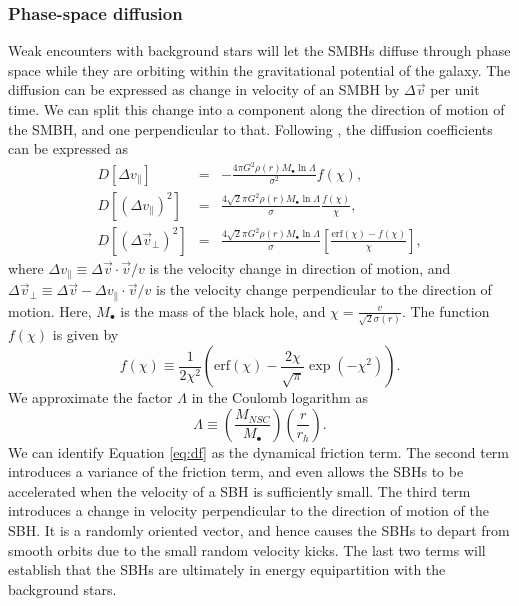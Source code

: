 \documentclass[english, backref,breaklinks,colorlinks,citecolor=blue, usenatbib]{mnras}
\begin{document}
\subsubsection{Phase-space diffusion} \label{psd}
Weak encounters with background stars will let the SMBHs diffuse through phase space while they are orbiting within the gravitational potential of the galaxy. The diffusion can be expressed as change in velocity of an SMBH by $\Delta \vec{v}$ per unit time. We can split this change into a component along the direction of motion of the SMBH, and one perpendicular to that. Following \citet{2008gady.book.....B}, the diffusion coefficients can be expressed as 
\begin{eqnarray}\label{eq:df}
D[\Delta v_\parallel] & = & -\frac{4\pi G^2\rho(r)M_\bullet\ln\Lambda}{\sigma^2}f(\chi),\\
D[(\Delta v_\parallel)^2] & = & \frac{4\sqrt{2}\pi G^2\rho(r)M_\bullet\ln\Lambda}{\sigma}\frac{f(\chi)}{\chi},\\
D[(\Delta \vec{v}_\bot)^2] & = & \frac{4\sqrt{2}\pi G^2\rho(r)M_\bullet\ln\Lambda}{\sigma}\left[\frac{\mbox{erf}(\chi)-f(\chi)}{\chi}\right],
\end{eqnarray} 
where $\Delta v_\parallel \equiv \Delta \vec{v}\cdot\vec{v}/v$ is the velocity change in direction of motion, and $\Delta \vec{v}_\bot \equiv \Delta \vec{v} - \Delta v_\parallel \cdot\vec{v}/v$ is the velocity change perpendicular to the direction of motion. Here, $M_\bullet$ is the mass of the black hole, and $\chi = \frac{v}{\sqrt{2}\sigma(r)}$. The function $f(\chi)$ is given by 
\begin{equation}
f(\chi) \equiv \frac{1}{2\chi^2}\left(\mbox{erf}(\chi)-\frac{2\chi}{\sqrt{\pi}}\exp\left(-\chi^2\right)\right).
\end{equation}
We approximate the factor $\Lambda$ in the Coulomb logarithm as
\begin{equation}
\Lambda \equiv \left(\frac{M_{NSC}}{M_\bullet}\right)\left(\frac{r}{r_h}\right).
\end{equation}
We can identify Equation \ref{eq:df} as the dynamical friction term. The second term introduces a variance of the friction term, and even allows the SBHs to be accelerated when the velocity of a SBH is sufficiently small. The third term introduces a change in velocity perpendicular to the direction of motion of the SBH. It is a randomly oriented vector, and hence causes the SBHs to depart from smooth orbits due to the small random velocity kicks. The last two terms will establish that the SBHs are ultimately in energy equipartition with the background stars.
\end{document}
